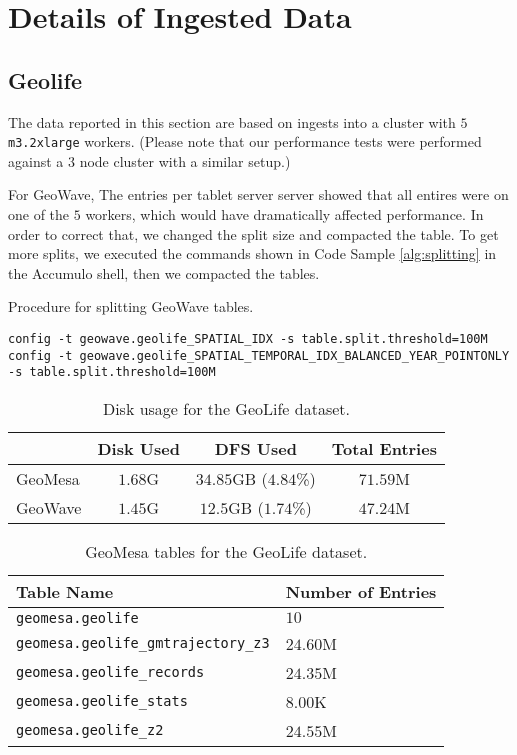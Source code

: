 \section{Details of Ingested Data}
\label{appendix:data}

\subsection{Geolife}

The data reported in this section are based on ingests into a cluster with $5$ \texttt{m3.2xlarge} workers.
(Please note that our performance tests were performed against a $3$ node cluster with a similar setup.)

For GeoWave, The entries per tablet server server showed that all entires were on one of the $5$ workers, which would have dramatically affected performance.
In order to correct that, we changed the split size and compacted the table.
To get more splits, we executed the commands shown in Code Sample \ref{alg:splitting} in the Accumulo shell, then we compacted the tables.

\begin{algorithm}[htb]
\caption{Procedure for splitting GeoWave tables.}\label{alg:splitting}
{\footnotesize\begin{lstlisting}
config -t geowave.geolife_SPATIAL_IDX -s table.split.threshold=100M
config -t geowave.geolife_SPATIAL_TEMPORAL_IDX_BALANCED_YEAR_POINTONLY -s table.split.threshold=100M
\end{lstlisting}}
\end{algorithm}

\begin{table}[h!tb]
  \centering
  \begin{tabular}{ | l || c | c | c | }
    \hline
    & Disk Used & DFS Used & Total Entries \\
    \hline
    GeoMesa & $1.68$G & $34.85$GB ($4.84$\%) & $71.59$M \\
    GeoWave & $1.45$G & $12.5$GB ($1.74$\%) & $47.24$M \\
    \hline
  \end{tabular}
  \caption{Disk usage for the GeoLife dataset.}
  \label{table:geolife:disk}
\end{table}

\begin{table}[h!tb]
  \centering
  \begin{tabular}{ | l | l | }
    \hline
    Table Name & Number of Entries \\
    \hline
    \texttt{geomesa.geolife} & $10$ \\
    \texttt{geomesa.geolife\_gmtrajectory\_z3} & $24.60$M \\
    \texttt{geomesa.geolife\_records} & $24.35$M \\
    \texttt{geomesa.geolife\_stats} & $8.00$K \\
    \texttt{geomesa.geolife\_z2} & $24.55$M \\
    \hline
  \end{tabular}
  \caption{GeoMesa tables for the GeoLife dataset.}
  \label{table:geolife:geomesa:tables}
\end{table}


